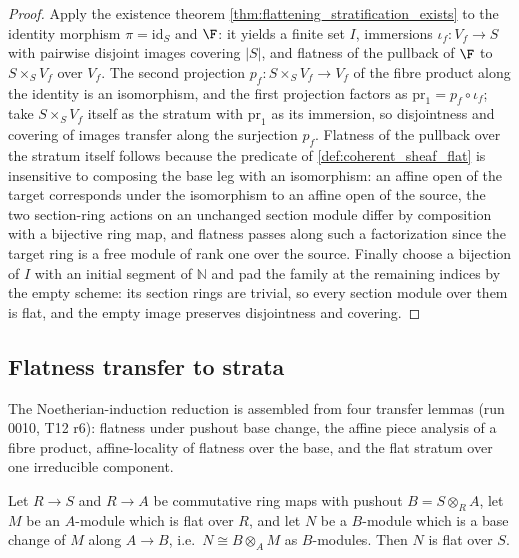 \begin{proof}
  \leanok
  Apply the existence theorem \cref{thm:flattening_stratification_exists} to
  the identity morphism \(\pi = \mathrm{id}_S\) and \(\F\): it yields a
  finite set \(I\), immersions \(\iota_f : V_f \to S\) with pairwise
  disjoint images covering \(|S|\), and flatness of the pullback of \(\F\)
  to \(S \times_S V_f\) over \(V_f\).  The second projection
  \(p_f : S \times_S V_f \to V_f\) of the fibre product along the identity
  is an isomorphism, and the first projection factors as
  \(\mathrm{pr}_1 = p_f \circ \iota_f\); take \(S \times_S V_f\) itself
  as the stratum with \(\mathrm{pr}_1\) as its immersion, so disjointness
  and covering of images transfer along the surjection \(p_f\).  Flatness of
  the pullback over the stratum itself follows because the predicate of
  \cref{def:coherent_sheaf_flat} is insensitive to composing the base leg
  with an isomorphism: an affine open of the target corresponds under the
  isomorphism to an affine open of the source, the two section-ring actions
  on an unchanged section module differ by composition with a bijective ring
  map, and flatness passes along such a factorization since the target ring
  is a free module of rank one over the source.  Finally choose a bijection
  of \(I\) with an initial segment of \(\mathbb{N}\) and pad the family at
  the remaining indices by the empty scheme: its section rings are trivial,
  so every section module over them is flat, and the empty image preserves
  disjointness and covering.
\end{proof}

\subsection{Flatness transfer to strata}
\label{subsec:flat_transfer_strata}

The Noetherian-induction reduction is assembled from four transfer lemmas
(run 0010, T12 r6): flatness under pushout base change, the affine piece
analysis of a fibre product, affine-locality of flatness over the base, and
the flat stratum over one irreducible component.

\begin{lemma}

\leanok
  \label{lem:flat_pushout_base_change}
  Let \(R \to S\) and \(R \to A\) be commutative ring maps with pushout
  \(B = S \otimes_R A\), let \(M\) be an \(A\)-module which is flat over
  \(R\), and let \(N\) be a \(B\)-module which is a base change of \(M\)
  along \(A \to B\), i.e.\ \(N \cong B \otimes_A M\) as \(B\)-modules.  Then
  \(N\) is flat over \(S\).
\end{lemma}

